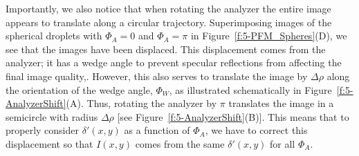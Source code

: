 Importantly, we also notice that when rotating the analyzer the entire image appears to translate along a circular trajectory.
Superimposing images of the spherical droplets with $\Phi_A = 0$ and $\Phi_A = \pi$ in Figure~\ref{f:5-PFM_Spheres}(D), we see that the images have been displaced.
This displacement comes from the analyzer; it has a wedge angle to prevent specular reflections from affecting the final image quality,.
However, this also serves to translate the image by $\Delta \rho$ along the orientation of the wedge angle, $\Phi_W$, as illustrated schematically in Figure~\ref{f:5-AnalyzerShift}(A).
Thus, rotating the analyzer by $\pi$ translates the image in a semicircle with radius $\Delta \rho$ [see Figure~\ref{f:5-AnalyzerShift}(B)].
This means that to properly consider $\delta'(x,y)$ as a function of $\Phi_A$, we have to correct this displacement so that $I(x,y)$ comes from the same $\delta'(x,y)$ for all $\Phi_A$.
